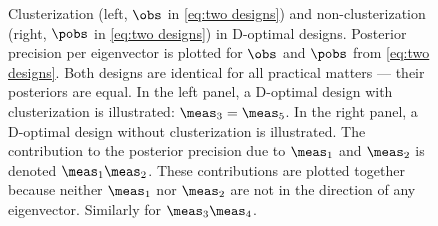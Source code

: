 \begin{figure}
  \caption{Clusterization (left, $\obs$ in \eqref{eq:two designs})
    and non-clusterization (right, $\pobs$ in \eqref{eq:two designs})
    in D-optimal designs. Posterior precision per eigenvector is
    plotted for $\obs$ and $\pobs$ from \eqref{eq:two
      designs}. Both designs are identical for all practical matters
    --- their posteriors are equal. In the left panel, a D-optimal
    design with clusterization is illustrated: $\meas_3 = \meas_5$. In
    the right panel, a D-optimal design without clusterization is
    illustrated. The contribution to the posterior precision due to
    $\meas_1$ and $\meas_2$ is denoted $\meas_1\meas_2$. These
    contributions are plotted together because neither $\meas_1$ nor
    $\meas_2$ are not in the direction of any eigenvector. Similarly
    for $\meas_3\meas_4$.}
  \label{fig:clusterization}
\end{figure}
